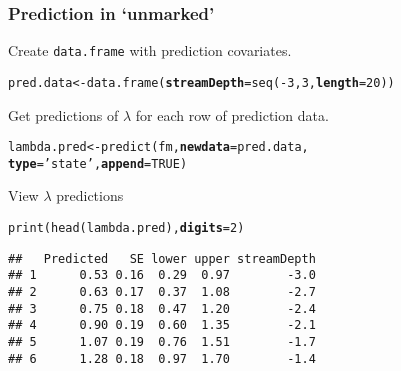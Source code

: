 \documentclass[color=usenames,dvipsnames]{beamer}\usepackage[]{graphicx}\usepackage[]{xcolor}
\makeatletter
\newcommand{\hlnum}[1]{\textcolor[rgb]{0.69,0.494,0}{#1}}%
\newcommand{\hlstr}[1]{\textcolor[rgb]{0.749,0.012,0.012}{#1}}%
\newcommand{\hlopt}[1]{\textcolor[rgb]{0,0,0}{#1}}%
\newcommand{\hlstd}[1]{\textcolor[rgb]{0,0,0}{#1}}%
\newcommand{\hlkwb}[1]{\textcolor[rgb]{0,0.341,0.682}{#1}}%
\newcommand{\hlkwc}[1]{\textcolor[rgb]{0,0,0}{\textbf{#1}}}%
\newcommand{\hlkwd}[1]{\textcolor[rgb]{0.004,0.004,0.506}{#1}}%
\newenvironment{kframe}{%
 \def\at@end@of@kframe{}%
 \ifinner\ifhmode%
  \def\at@end@of@kframe{\end{minipage}}%
  \begin{minipage}{\columnwidth}%
 \fi\fi%
 \def\FrameCommand##1{\hskip\@totalleftmargin \hskip-\fboxsep
 \colorbox{shadecolor}{##1}\hskip-\fboxsep
     \hskip-\linewidth \hskip-\@totalleftmargin \hskip\columnwidth}%
 \MakeFramed {\advance\hsize-\width
   \@totalleftmargin\z@ \linewidth\hsize
   \@setminipage}}%
 {\par\unskip\endMakeFramed%
 \at@end@of@kframe}
\newenvironment{knitrout}{}{} %
\makeatother
\begin{document}
\begin{frame}[fragile]
  \frametitle{Prediction in `unmarked'}
  \small
  Create \texttt{data.frame} with prediction covariates. 
  \vspace{-6pt}
\begin{knitrout}\footnotesize
{}\color{fgcolor}\begin{kframe}
\begin{alltt}
\hlstd{pred.data} \hlkwb{<-} \hlkwd{data.frame}\hlstd{(}\hlkwc{streamDepth}\hlstd{=}\hlkwd{seq}\hlstd{(}\hlopt{-}\hlnum{3}\hlstd{,} \hlnum{3}\hlstd{,} \hlkwc{length}\hlstd{=}\hlnum{20}\hlstd{))}
\end{alltt}
\end{kframe}
\end{knitrout}
\pause
\vfill
Get predictions of $\lambda$ for each row of prediction data.
  \vspace{-6pt}
\begin{knitrout}\footnotesize
{}\color{fgcolor}\begin{kframe}
\begin{alltt}
\hlstd{lambda.pred} \hlkwb{<-} \hlkwd{predict}\hlstd{(fm,} \hlkwc{newdata}\hlstd{=pred.data,}
                       \hlkwc{type}\hlstd{=}\hlstr{'state'}\hlstd{,} \hlkwc{append}\hlstd{=}\hlnum{TRUE}\hlstd{)}
\end{alltt}
\end{kframe}
\end{knitrout}
\pause
\vfill
  View $\lambda$ predictions
  \vspace{-6pt}
\begin{knitrout}\footnotesize
{}\color{fgcolor}\begin{kframe}
\begin{alltt}
\hlkwd{print}\hlstd{(}\hlkwd{head}\hlstd{(lambda.pred),} \hlkwc{digits}\hlstd{=}\hlnum{2}\hlstd{)}
\end{alltt}
\begin{verbatim}
##   Predicted   SE lower upper streamDepth
## 1      0.53 0.16  0.29  0.97        -3.0
## 2      0.63 0.17  0.37  1.08        -2.7
## 3      0.75 0.18  0.47  1.20        -2.4
## 4      0.90 0.19  0.60  1.35        -2.1
## 5      1.07 0.19  0.76  1.51        -1.7
## 6      1.28 0.18  0.97  1.70        -1.4
\end{verbatim}
\end{kframe}
\end{knitrout}
\end{frame}
\end{document}

